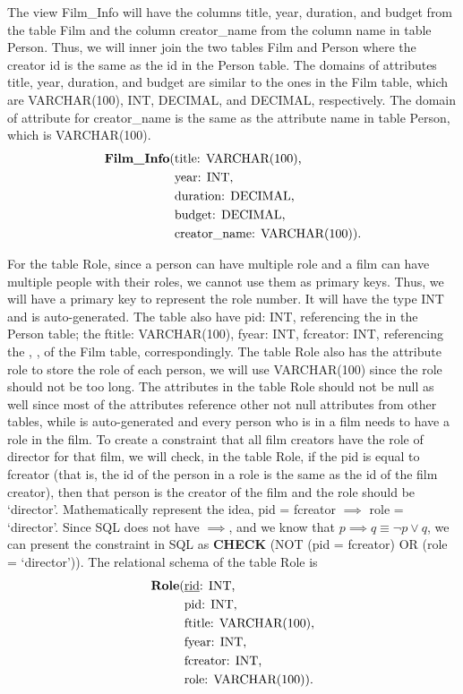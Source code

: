 \documentclass{article}
\newcommand{\key}[1]{\underline{\smash{#1}}}
\begin{document}
The view Film\_Info will have the columns title, year, duration, and budget from
the table Film and the column creator\_name from the column name in table
Person. Thus, we will inner join the two tables Film and Person where the
creator id is the same as the id in the Person table. The domains of attributes
title, year, duration, and budget are similar to the ones in the Film table,
which are VARCHAR(100), INT, DECIMAL, and DECIMAL, respectively. The domain of
attribute for creator\_name is the same as the attribute name in table Person,
which is VARCHAR(100).
\begin{align*}
    \text{\textbf{Film\_Info}(} & \text{title: VARCHAR(100),} \\
                                & \text{year: INT,} \\
                                & \text{duration: DECIMAL,} \\
                                & \text{budget: DECIMAL,} \\
                                & \text{creator\_name: VARCHAR(100)).}
\end{align*}

For the table Role, since a person can have multiple role and a film can have
multiple people with their roles, we cannot use them as primary keys. Thus, we
will have a primary key \key{rid} to represent the role number. It will have the
type INT and is auto-generated. The table also have pid: INT, referencing the
\key{id} in the Person table; the ftitle: VARCHAR(100), fyear: INT, fcreator:
INT, referencing the \key{title}, \key{year}, \key{creator} of the Film table,
correspondingly. The table Role also has the attribute role to store the role of
each person, we will use VARCHAR(100) since the role should not be too long. The
attributes in the table Role should not be null as well since most of the
attributes reference other not null attributes from other tables, while
\key{rid} is auto-generated and every person who is in a film needs to have a
role in the film. To create a constraint that all film creators have the role of
director for that film, we will check, in the table Role, if the pid is equal to
fcreator (that is, the id of the person in a role is the same as the id of the
film creator), then that person is the creator of the film and the role should
be `director'. Mathematically represent the idea, pid = fcreator $\implies$ role
= `director'. Since SQL does not have $\implies$, and we know that $p \implies q
\equiv \neg p \lor q$, we can present the constraint in SQL as \textbf{CHECK}
(NOT (pid = fcreator) OR (role = `director')). The relational schema of the
table Role is
\begin{align*}
    \text{\textbf{Role}(} & \text{\key{rid}: INT,} \\
                          & \text{pid: INT,} \\
                          & \text{ftitle: VARCHAR(100),} \\
                          & \text{fyear: INT,} \\
                          & \text{fcreator: INT,} \\
                          & \text{role: VARCHAR(100)).}
\end{align*}
\end{document}

